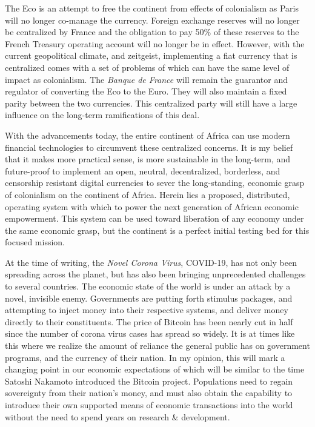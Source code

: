 \documentclass[10pt, titlepage, twocolumn]{report}
\begin{document}
\hspace*{24pt}
The Eco is an attempt to free the continent from effects of colonialism as Paris will no longer co-manage the currency. Foreign exchange reserves will no longer be centralized by France and the obligation to pay 50\% of these reserves to the French Treasury operating account will no longer be in effect. However, with the current geopolitical climate, and zeitgeist, implementing a fiat currency that is centralized comes with a set of problems of which can have the same level of impact as colonialism. The \textit{Banque de France} will remain the guarantor and regulator of converting the Eco to the Euro. They will also maintain a fixed parity between the two currencies. This centralized party will still have a large influence on the long-term ramifications of this deal. 

\hspace*{24pt}
With the advancements today, the entire continent of Africa can use modern financial technologies to circumvent these centralized concerns. It is my belief that it makes more practical sense, is more sustainable in the long-term, and future-proof to implement an open, neutral, decentralized, borderless, and censorship resistant digital currencies to sever the long-standing, economic grasp of colonialism on the continent of Africa. Herein lies a proposed, distributed, operating system with which to power the next generation of African economic empowerment. This system can be used toward liberation of any economy under the same economic grasp, but the continent is a perfect initial testing bed for this focused mission.

\hspace*{24pt}
At the time of writing, the \textit{Novel Corona Virus}, COVID-19, has not only been spreading across the planet, but has also been bringing unprecedented challenges to several countries. The economic state of the world is under an attack by a novel, invisible enemy. Governments are putting forth stimulus packages, and attempting to inject money into their respective systems, and deliver money directly to their constituents. The price of Bitcoin has been nearly cut in half since the number of corona virus cases has spread so widely. It is at times like this where we realize the amount of reliance the general public has on government programs, and the currency of their nation. In my opinion, this will mark a changing point in our economic expectations of which will be similar to the time Satoshi Nakamoto introduced the Bitcoin project. Populations need to regain sovereignty from their nation's money, and must also obtain the capability to introduce their own supported means of economic transactions into the world without the need to spend years on research \& development.
\end{document}
